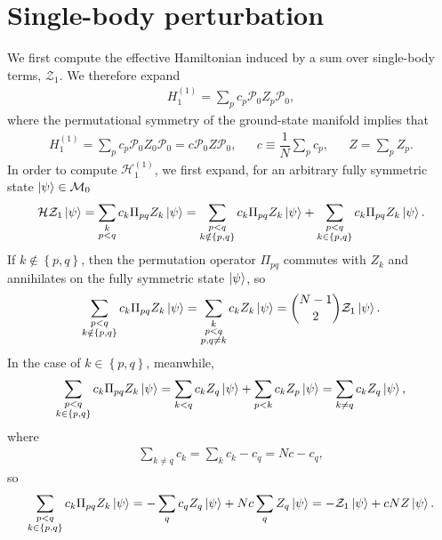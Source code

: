 \documentclass[nofootinbib,notitlepage,11pt]{revtex4-2}
\newcommand{\f}[2]{\dfrac{#1}{#2}} %
\newcommand{\p}[1]{\left(#1\right)} %
\renewcommand{\set}[1]{\left\{#1\right\}} %
\newcommand{\1}{\mathds{1}}
\renewcommand{\H}{\mathcal{H}}
\newcommand{\M}{\mathcal{M}}
\renewcommand{\P}{\mathcal{P}}
\newcommand{\Z}{\mathcal{Z}}
\begin{document}
\section{Single-body perturbation}

We first compute the effective Hamiltonian induced by a sum over
single-body terms, $\Z_1$.  We therefore expand
\begin{align}
  H_1^{(1)} = \sum_p c_p \P_0 Z_p \P_0,
\end{align}
where the permutational symmetry of the ground-state manifold implies
that
\begin{align}
  H_1^{(1)} =  \sum_p c_p \P_0 Z_0 \P_0 = c \P_0 Z \P_0,
  &&
  c \equiv \f1N \sum_p c_p,
  &&
  Z = \sum_p Z_p.
\end{align}
In order to compute $\H_1^{(1)}$, we first expand, for an arbitrary
fully symmetric state $\ket\psi\in\M_0$
\begin{align}
  \H \Z_1 \ket\psi
  = \sum_{\substack{k\\p<q}} c_k \Pi_{pq} Z_k \ket\psi
  = \sum_{\substack{p<q\\k\notin\set{p,q}}} c_k \Pi_{pq} Z_k \ket\psi
  + \sum_{\substack{p<q\\k\in\set{p,q}}} c_k \Pi_{pq} Z_k \ket\psi.
\end{align}
If $k\notin\set{p,q}$, then the permutation operator $\Pi_{pq}$
commutes with $Z_k$ and annihilates on the fully symmetric state
$\ket\psi$, so
\begin{align}
  \sum_{\substack{p<q\\k\notin\set{p,q}}}
  c_k \Pi_{pq} Z_k \ket\psi
  = \sum_{\substack{k\\p<q\\p,q\ne k}}
  c_k Z_k \ket\psi
  = {N-1 \choose 2} \Z_1 \ket\psi.
\end{align}
In the case of $k\in\set{p,q}$, meanwhile,
\begin{align}
  \sum_{\substack{p<q\\k\in\set{p,q}}} c_k \Pi_{pq} Z_k \ket\psi
  = \sum_{k<q} c_k Z_q \ket\psi
  + \sum_{p<k} c_k Z_p \ket\psi
  = \sum_{k\ne q} c_k Z_q \ket\psi,
\end{align}
where
\begin{align}
  \sum_{k\ne q} c_k = \sum_k c_k - c_q = N c - c_q,
\end{align}
so
\begin{align}
  \sum_{\substack{p<q\\k\in\set{p,q}}} c_k \Pi_{pq} Z_k \ket\psi
  = - \sum_q c_q Z_q \ket\psi + N c \sum_q Z_q \ket\psi
  = - \Z_1 \ket\psi + c N Z \ket\psi.
\end{align}
\end{document}
